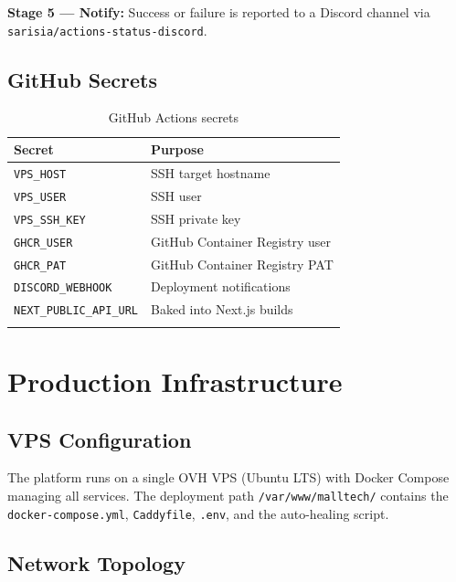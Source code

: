 \textbf{Stage 5 — Notify:} Success or failure is reported to a Discord channel via
\texttt{sarisia/actions-status-discord}.

\subsection{GitHub Secrets}

\begin{longtable}{|m{4.5cm}|m{9cm}|}
    \hline
    \textbf{Secret}                   & \textbf{Purpose}               \\
    \hline
    \endhead
    \endfoot
    \endlastfoot
    \hline
    \texttt{VPS\_HOST}                & SSH target hostname            \\
    \hline
    \texttt{VPS\_USER}                & SSH user                       \\
    \hline
    \texttt{VPS\_SSH\_KEY}            & SSH private key                \\
    \hline
    \texttt{GHCR\_USER}               & GitHub Container Registry user \\
    \hline
    \texttt{GHCR\_PAT}                & GitHub Container Registry PAT  \\
    \hline
    \texttt{DISCORD\_WEBHOOK}         & Deployment notifications       \\
    \hline
    \texttt{NEXT\_PUBLIC\_{}API\_URL} & Baked into Next.js builds      \\
    \hline
    \caption{GitHub Actions secrets}
    \label{tab:secrets}
\end{longtable}

\section{Production Infrastructure}

\subsection{VPS Configuration}

The platform runs on a single OVH VPS (Ubuntu LTS) with Docker Compose managing
all services. The deployment path \texttt{/var/www/malltech/} contains the
\texttt{docker-compose.yml}, \texttt{Caddyfile}, \texttt{.env}, and the auto-healing
script.

\subsection{Network Topology}

